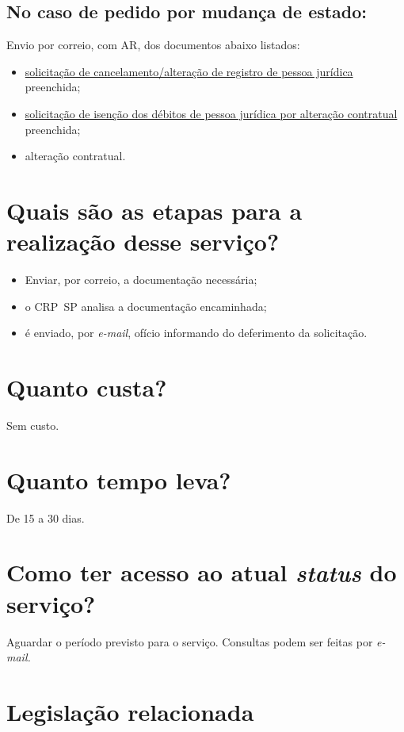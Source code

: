 \subsection{No caso de pedido por mudança de estado:}

Envio por correio, com AR, dos documentos abaixo listados:

\begin{itemize}
  \item  \hyperref[]{solicitação  de cancelamento/alteração de registro de pessoa jurídica} preenchida;
  \item  \hyperref[]{solicitação  de isenção dos débitos de pessoa jurídica por alteração contratual}  preenchida;
  \item  alteração contratual.
\end{itemize}

\section{Quais são as etapas para a realização desse serviço?}

\begin{itemize}
  \item  Enviar, por correio, a documentação necessária;
  \item  o CRP~SP analisa a documentação encaminhada;
  \item  é enviado, por \emph{e-mail}, ofício informando do deferimento da  solicitação.
\end{itemize}

\section{Quanto custa?}

Sem custo.

\section{Quanto tempo leva?}

De 15 a 30 dias.

\section{Como ter acesso ao atual \emph{status} do serviço?}

Aguardar o período previsto para o serviço. Consultas podem ser feitas por \emph{e-mail.}

\section{Legislação relacionada}

